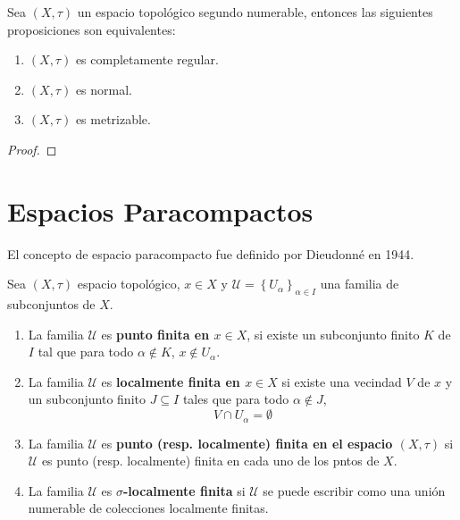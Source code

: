 \documentclass[12pt]{report}
\theoremstyle{largebreak}
\begin{document}
    \begin{excer}
        Sea $(X,\tau)$ un espacio topológico segundo numerable, entonces las siguientes proposiciones son equivalentes:
        \begin{enumerate}
            \item $(X,\tau)$ es completamente regular.
            \item $(X,\tau)$ es normal.
            \item $(X,\tau)$ es metrizable.
        \end{enumerate}
    \end{excer}

    \begin{proof}
    \end{proof}

    \section{Espacios Paracompactos}

    \begin{obs}
        El concepto de espacio paracompacto fue definido por Dieudonné en 1944.
    \end{obs}

    \begin{mydef}
        Sea $(X,\tau)$ espacio topológico, $x\in X$ y $\mathcal{U}=\left\{U_\alpha \right\}_{ \alpha\in I}$ una familia de subconjuntos de $X$.
        \begin{enumerate}
            \item La familia $\mathcal{U}$ es \textbf{punto finita en $x\in X$}, si existe un subconjunto finito $K$ de $I$ tal que para todo $\alpha\notin K$, $x\notin U_\alpha$.
            \item La familia $\mathcal{U}$ es \textbf{localmente finita en $x\in X$} si existe una vecindad $V$ de $x$ y un subconjunto finito $J\subseteq I$ tales que para todo $\alpha\notin J$,
            \begin{equation*}
                V\cap U_\alpha=\emptyset
            \end{equation*}
            \item La familia $\mathcal{U}$ es \textbf{punto (resp. localmente) finita en el espacio $(X,\tau)$} si $\mathcal{U}$ es punto (resp. localmente) finita en cada uno de los pntos de $X$.
            \item La familia $\mathcal{U}$ es \textbf{$\sigma$-localmente finita} si $\mathcal{U}$ se puede escribir como una unión numerable de colecciones localmente finitas.
        \end{enumerate}
    \end{mydef}
\end{document}
